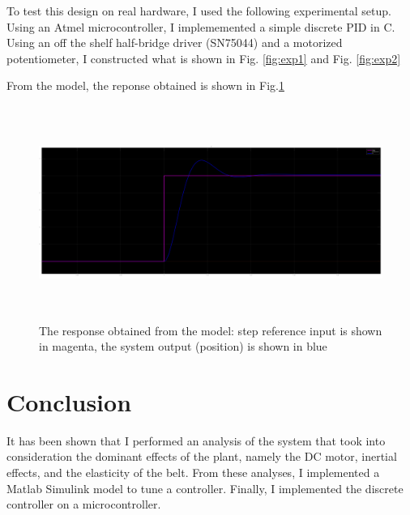 \documentclass[Nomencl]{SelimArticle}
\begin{document}
To test this design on real hardware, I used the following experimental setup. Using an Atmel microcontroller, I implememented a simple discrete PID in C.
Using an off the shelf half-bridge driver (SN75044) and a motorized potentiometer, I constructed what is shown in Fig. \ref{fig:exp1} and Fig. \ref{fig:exp2}

From the model, the reponse obtained is shown in Fig.\ref{fig:response}
\begin{figure}[!ht]
    \centering
    \includegraphics[width=\textwidth, height=2.75in]{response2}
    \caption{The response obtained from the model: step reference input is shown in magenta, the system output (position) is shown in blue}
    \label{fig:response}
\end{figure}

\section{Conclusion}
It has been shown that I performed an analysis of the system that took into consideration the dominant effects of the plant, namely the DC motor, inertial effects, and the elasticity of the belt. From these analyses, I implemented a Matlab Simulink model to tune a controller. Finally, I implemented the discrete controller on a microcontroller.





\end{document}
